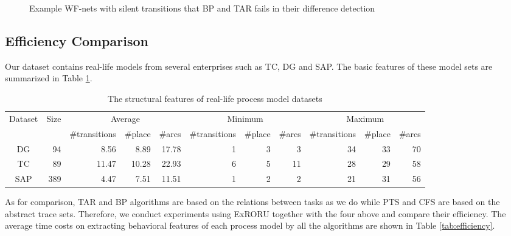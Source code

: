 \documentclass{llncs}
\begin{document}
\begin{figure}[htbp]
{\begin{minipage}[b]{0.27\textwidth}
	\end{minipage}
	\label{fig:silentExampleC}
}
\caption{Example WF-nets with silent transitions that BP and TAR fails in their difference detection\label{fig:silentExamples}}
\end{figure}

\subsection{Efficiency Comparison}\label{subsec:efficiency}
Our dataset contains real-life models from several enterprises such as TC, DG and SAP. The basic features of these model sets are summarized in Table \ref{tab:datasets}.

\begin{table}[htbp]
\centering
\caption{The structural features of real-life process model datasets\label{tab:datasets}}
\scriptsize
\begin{tabular}{|c|r|r|r|r|r|r|r|r|r|r|} \hline
	\multicolumn{1}{|c|}{\multirow{2}{*}{Dataset}} & \multicolumn{1}{c|}{\multirow{2}{*}{Size}} & \multicolumn{3}{|c}{Average} & \multicolumn{3}{|c}{Minimum} & \multicolumn{3}{|c|}{Maximum}\\ \cline{3-11}
	\multicolumn{1}{|c|}{} & \multicolumn{1}{c|}{} & \multicolumn{1}{c|}{\#transitions} & \multicolumn{1}{c|}{\#place} & \multicolumn{1}{c|}{\#arcs} & \multicolumn{1}{c|}{\#transitions} & \multicolumn{1}{c|}{\#place} & \multicolumn{1}{c|}{\#arcs} & \multicolumn{1}{c|}{\#transitions} & \multicolumn{1}{c|}{\#place} & \multicolumn{1}{c|}{\#arcs}\\ \hline
	DG & 94 & 8.56 & 8.89 & 17.78 & 1 & 3 & 3 & 34 & 33 & 70 \\ \hline
	TC & 89 & 11.47 & 10.28 & 22.93 & 6 & 5 & 11 & 28 & 29 & 58 \\ \hline
	SAP & 389 & 4.47 & 7.51 & 11.51 & 1 & 2 & 2 & 21 & 31 & 56 \\ \hline
\end{tabular}
\end{table}

As for comparison, TAR and BP algorithms are based on the relations between tasks as we do while PTS and CFS are based on the abstract trace sets. Therefore, we conduct experiments using ExRORU together with the four above and compare their efficiency. The average time costs on extracting behavioral features of each process model by all the algorithms are shown in Table \ref{tab:efficiency}.
\end{document}
